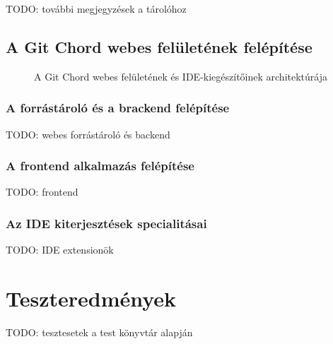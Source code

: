 \documentclass[
]{elteikthesis}[2025/03/25]
\begin{document}
TODO: további megjegyzések a tárolóhoz

\section{A Git Chord webes felületének felépítése}

\begin{figure}[H]
\centering

\caption{A Git Chord webes felületének és IDE-kiegészítőinek architektúrája}
\label{fig:git-chord-gui-architecture}
\end{figure}

\subsection{A forrástároló és a brackend felépítése}

TODO: webes forrástároló és backend

\subsection{A frontend alkalmazás felépítése}

TODO: frontend

\subsection{Az IDE kiterjesztések specialitásai}

TODO: IDE extensionök

\cleardoublepage

\appendix

\chapter{Teszteredmények}

TODO: tesztesetek a test könyvtár alapján

\cleardoublepage

{}
\printbibliography[title=\biblabel]
\cleardoublepage

{}
\listoffigures
\cleardoublepage

{}
\listoftables
\cleardoublepage

{}
\listofalgorithms
\cleardoublepage
\end{document}
